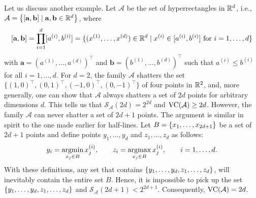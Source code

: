 Let us discuss another example. Let $\mathcal{A}$ be the set of hyperrectangles in $\mathbb{R}^d$, i.e., $\mathcal{A} = \set{[\mathbf{a}, \mathbf{b}] \with \mathbf{a}, \mathbf{b} \in \R^d}$, where
\[
    [\mathbf{a}, \mathbf{b}] = \prod_{i=1}^d [a^{(i)}, b^{(i)}] = \{(x^{(1)}, \dots, x^{(d)}) \in \mathbb{R}^d \mathrel{|} x^{(i)} \in [a^{(i)}, b^{(i)}] \text{ for } i = 1, \dots, d\}
\]
with $\mathbf{a} = (a^{(1)}, \dots, a^{(d)})^{\top}$ and $\mathbf{b} = (b^{(1)}, \dots, b^{(d)})^{\top}$ such that $a^{(i)} \leq b^{(i)}$ for all $i = 1, \dots, d$. For $d=2$, the family $\mathcal{A}$ shatters the set $\{(1, 0)^{\top}, (0, 1)^{\top}, (-1, 0)^{\top}, (0, -1)^{\top}\}$ of four points in $\mathbb{R}^2$, and, more generally, one can show that $\mathcal{A}$ always shatters a set of $2d$ points for arbitrary dimensions $d$. This tells us that $\mathcal{S}_{\mathcal{A}}(2d) = 2^{2d}$ and $\operatorname{VC}(\mathcal{A}) \geq 2d$. However, the family $\mathcal{A}$ can never shatter a set of $2d + 1$ points. The argument is similar in spirit to the one made earlier for half-lines. Let $B = \set{x_1, \dots, x_{2d+1}}$ be a set of $2d + 1$ points and define points $y_1, \dots, y_d$ and $z_1, \dots, z_d$ as follows:
\[
    y_i = \operatorname*{argmin}_{x_j \in B} x_j^{(i)}, \qquad z_i = \operatorname*{argmax}_{x_j \in B} x_j^{(i)}, \qquad i = 1, \dots, d.
\]
With these definitions, any set that contains $\set{y_1, \dots, y_d, z_1, \dots, z_d}$, will inevitably contain the entire set $B$. Hence, it is impossible to pick up the set $\set{y_1, \dots, y_d, z_1, \dots, z_d}$ and $\mathcal{S}_{\mathcal{A}}(2d + 1) < 2^{2d + 1}$. Consequently, $\operatorname{VC}(\mathcal{A}) = 2d$.
